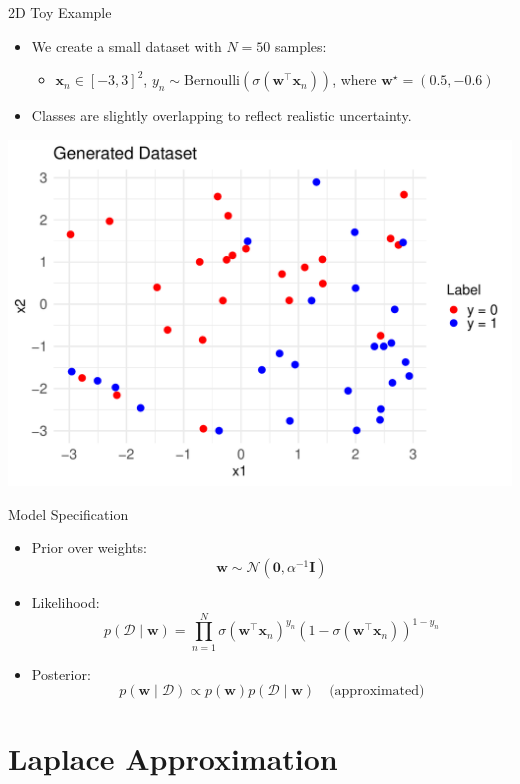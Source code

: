 \documentclass{beamer}
\begin{document}
\begin{frame}{2D Toy Example}
\begin{itemize}
  \item We create a small dataset with $N=50$ samples:
  \begin{itemize}
    \item $\mathbf{x}_n \in [-3, 3]^2$, $y_n \sim \mathrm{Bernoulli}(\sigma(\mathbf{w}^\top \mathbf{x}_n))$, where $\mathbf{w}^\star = (0.5, -0.6)$
  \end{itemize}
  \item Classes are slightly overlapping to reflect realistic uncertainty.
\end{itemize}

\vspace{0.5em}
\begin{center}
  \includegraphics[width=0.6\linewidth]{figures/generated_dataset.pdf}
\end{center}
\end{frame}

\begin{frame}{Model Specification}
\begin{itemize}
  \item Prior over weights:
  \[
    \mathbf{w} \sim \mathcal{N}(\mathbf{0}, \alpha^{-1} \mathbf{I})
  \]
  \item Likelihood:
  \[
    p(\mathcal{D} \mid \mathbf{w}) = \prod_{n=1}^{N} \sigma(\mathbf{w}^\top \mathbf{x}_n)^{y_n} (1 - \sigma(\mathbf{w}^\top \mathbf{x}_n))^{1 - y_n}
  \]
  \item Posterior:
  \[
    p(\mathbf{w} \mid \mathcal{D}) \propto p(\mathbf{w}) p(\mathcal{D} \mid \mathbf{w}) \quad \text{(approximated)}
  \]
\end{itemize}
\end{frame}

\section{Laplace Approximation}
\end{document}
